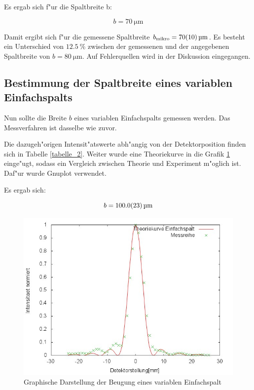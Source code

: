 			Es ergab sich f"ur die Spaltbreite b:

			\begin{equation}
				b = \SI{70}{\micro \meter}
			\end{equation}

			Damit ergibt sich f"ur die gemessene Spaltbreite $b_\mathrm{mikro} = \SI{70 (10)}{\micro \meter}$.
			Es besteht ein Unterschied von $\SI{12.5}{\percent}$ zwischen der gemessenen und der angegebenen Spaltbreite von $b = \SI{80}{\micro \meter}$.
			Auf Fehlerquellen wird in der Diskussion eingegangen.
			\clearpage
			\newpage

	\subsection{Bestimmung der Spaltbreite eines variablen Einfachspalts} 
		\label{sub:bestimmung_der_spaltbreite_eines_variablen_einfachspalts}
		
		Nun sollte die Breite $b$ eines variablen Einfachspalts gemessen werden. Das Messverfahren ist dasselbe wie zuvor.

		Die dazugeh"origen Intensit"atswerte abh"angig von der Detektorposition finden sich in Tabelle \ref{tabelle_2}. Weiter wurde eine Theoriekurve in die Grafik \ref{graph2} einge"ugt, sodass ein Vergleich zwischen Theorie und Experiment m"oglich ist. Daf"ur wurde Gnuplot verwendet.

		Es ergab sich:

		\begin{equation}
			b = \SI{100.0 (23)}{\micro \meter}
		\end{equation}

		

		\begin{figure}[H]
			\centering
			\includegraphics[width = 14cm]{graph2.jpg}
			\caption{Graphische Darstellung der Beugung eines variablen Einfachspalt}
			\label{graph2}
		\end{figure}

